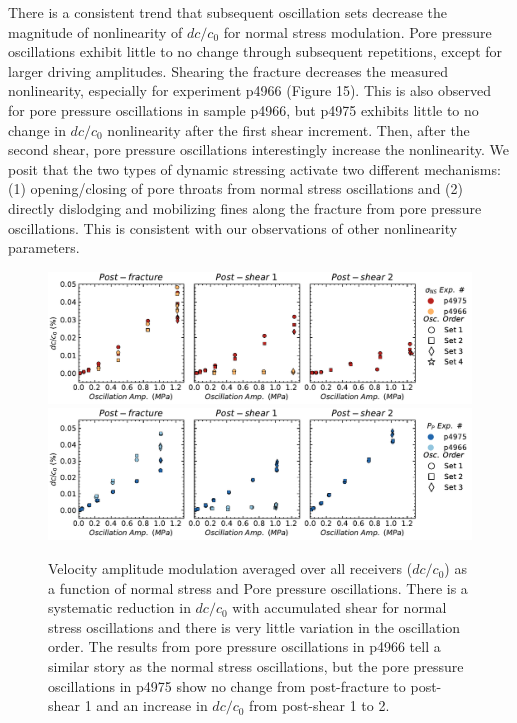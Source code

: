 \documentclass[letterpaper,10pt]{article}
\begin{document}
There is a consistent trend that subsequent oscillation sets decrease the magnitude of nonlinearity of $ dc/c_0 $ for normal stress modulation. Pore pressure oscillations exhibit little to no change through subsequent repetitions, except for larger driving amplitudes.  Shearing the fracture decreases the measured nonlinearity, especially for experiment p4966 (Figure 15). This is also observed for pore pressure oscillations in sample p4966, but p4975 exhibits little to no change in $ dc/c_0 $ nonlinearity after the first shear increment. Then, after the second shear, pore pressure oscillations interestingly increase the nonlinearity. We posit that the two types of dynamic stressing activate two different mechanisms: (1) opening/closing of pore throats from normal stress oscillations and (2) directly dislodging and mobilizing fines along the fracture from pore pressure oscillations. This is consistent with our observations of other nonlinearity parameters. 
\clearpage

\begin{figure}[ht]
	\centering
	\includegraphics[width=1\columnwidth]{dc_amp_NS}
	\includegraphics[width=1\columnwidth]{dc_amp_PP}
	\caption{Velocity amplitude modulation averaged over all receivers ($ dc/c_0 $) as a function of normal stress and Pore pressure oscillations. There is a systematic reduction in $ dc/c_0 $ with accumulated shear for normal stress oscillations and there is very little variation in the oscillation order. The results from pore pressure oscillations in p4966 tell a similar story as the normal stress oscillations, but the pore pressure oscillations in p4975 show no change from post-fracture to post-shear 1 and an increase in $ dc/c_0 $ from post-shear 1 to 2.}
	\label{fig:dc_plots2}
\end{figure}
\clearpage
\end{document}
